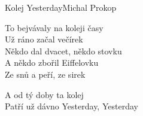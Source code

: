 \begin{song}{Kolej Yesterday}{Michal Prokop}
\begin{guitar}
To bejvávaly na koleji časy\\
Už ráno začal večírek\\
Někdo dal dvacet, někdo stovku\\
A někdo zbořil Eiffelovku\\
Ze snů a peří, ze sirek\\
\end{guitar}

\begin{guitar}
A od tý doby ta kolej\\
Patří už dávno Yesterday, Yesterday\\
\end{guitar}
\end{song}

